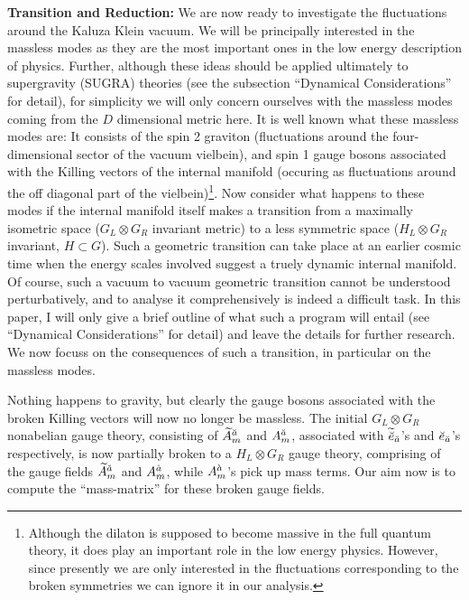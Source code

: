 \documentclass[a4paper,12pt]{article}
\begin{document}
{\bf Transition and Reduction:} We are now ready to investigate the fluctuations around the Kaluza Klein vacuum. We will be principally interested in the massless modes as they are the most important ones in the low energy description of physics. Further, although these ideas should be applied ultimately to supergravity (SUGRA) theories (see the subsection ``Dynamical Considerations'' for detail), for simplicity we will only concern ourselves  with the massless modes coming from the $D$ dimensional metric here. It is  well known what these massless modes are: It consists of the spin 2 graviton (fluctuations around the four-dimensional sector of the vacuum vielbein), and spin 1 gauge bosons associated with the Killing vectors of the internal manifold (occuring as fluctuations around the off diagonal part of the vielbein)\footnote{Although the dilaton is supposed to become massive in the full quantum theory, it does play an important role in the low energy physics. However, since presently we are only interested in the fluctuations corresponding to the broken symmetries we can ignore it in our analysis.}. Now consider what happens to these modes if the internal manifold itself makes a transition from a maximally isometric space ($G_L\otimes G_R$ invariant metric) to a less symmetric space ($H_L\otimes G_R$ invariant, $H\subset G$).  Such a geometric transition can take place at an earlier cosmic time when the energy scales involved suggest a truely dynamic internal manifold. Of course, such a vacuum to vacuum geometric transition  cannot be understood  perturbatively, and to analyse it comprehensively is indeed a difficult task. In this paper, I will only give a brief outline of what such a program will entail (see ``Dynamical Considerations'' for detail) and leave the details for further research. We now focuss on the consequences of such a transition, in particular on the massless modes. 

Nothing happens to gravity, but clearly the gauge bosons associated with the broken  Killing vectors will now no longer be massless. The initial $G_L\otimes G_R$ nonabelian gauge theory, consisting of  $\widetilde{A}^{\breve{a}}_m$ and $A^{\breve{a}}_m$, associated with $\widetilde{\breve{e}}_{\breve{a}}$'s and $\breve{e}_{\breve{a}}$'s respectively, is now partially broken  to a $H_L\otimes G_R$ gauge theory, comprising of the gauge fields $\widetilde{A}^{\breve{a}}_m$ and $A^{\dot{a}}_m$, while $A^{\grave{a}}_m$'s pick up  mass terms. Our aim now is to compute the ``mass-matrix'' for these broken gauge fields.
\end{document}
